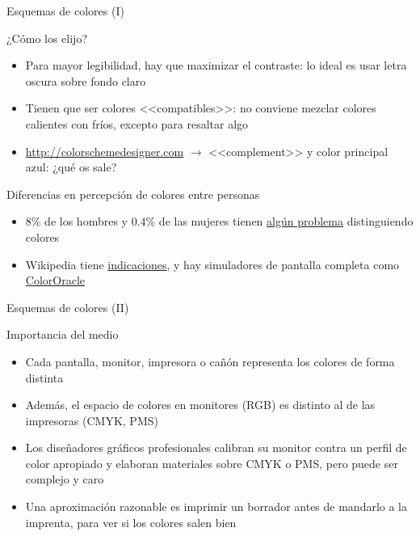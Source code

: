 \documentclass[xcolor=svgnames,compress]{beamer}
\begin{document}
\begin{frame}{Esquemas de colores (I)}

  \begin{block}{¿Cómo los elijo?}
    \begin{itemize}
    \item Para mayor legibilidad, hay que maximizar el contraste: lo
      ideal es usar letra oscura sobre fondo claro
    \item Tienen que ser colores <<compatibles>>: no conviene mezclar
      colores calientes con fríos, excepto para resaltar algo
    \item \url{http://colorschemedesigner.com} $\rightarrow$
      <<complement>> y color principal azul: ¿qué os sale?
    \end{itemize}
  \end{block}

  \begin{block}{Diferencias en percepción de colores entre personas}
    \begin{itemize}
    \item 8\% de los hombres y $0.4$\% de las mujeres tienen
      \href{http://en.wikipedia.org/wiki/Color_blindness\#cite_note-Howard_Hughes_Medical_Institute-28}{algún
        problema} distinguiendo colores
    \item Wikipedia tiene
      \href{http://en.wikipedia.org/wiki/Category:Articles_with_images_not_understandable_by_color_blind_users\#Tips_for_editors}{indicaciones},
      y hay simuladores de pantalla completa como
      \href{http://colororacle.org/}{ColorOracle}
    \end{itemize}
  \end{block}

\end{frame}

\begin{frame}{Esquemas de colores (II)}

  \begin{block}{Importancia del medio}
    \begin{itemize}
    \item Cada pantalla, monitor, impresora o cañón representa los
      colores de forma distinta
    \item Además, el espacio de colores en monitores (RGB) es distinto
      al de las impresoras (CMYK, PMS)
    \item Los diseñadores gráficos profesionales calibran su monitor
      contra un perfil de color apropiado y elaboran materiales sobre
      CMYK o PMS, pero puede ser complejo y caro
    \item Una aproximación razonable es imprimir un borrador antes de
      mandarlo a la imprenta, para ver si los colores salen bien
    \end{itemize}
  \end{block}
  
\end{frame}
\end{document}
